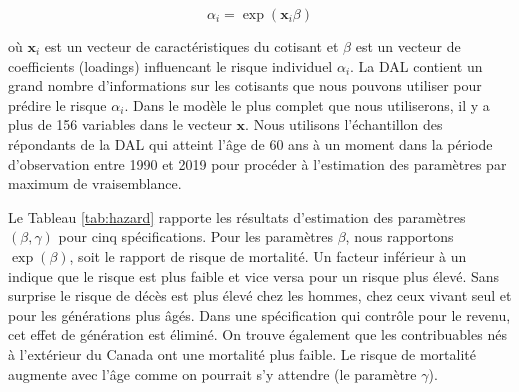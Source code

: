 \documentclass[french, 12pt]{article}
\begin{document}
	$$ \alpha_i = \exp\left(\mathbf{x}_i\beta\right) $$
	
	où $\mathbf{x}_i$ est un vecteur de caractéristiques du cotisant et $\beta$ est un vecteur de coefficients (loadings) influencant le risque individuel $\alpha_i$. La DAL contient un grand nombre d'informations sur les cotisants que nous pouvons utiliser pour prédire le risque $\alpha_i$. Dans le modèle le plus complet que nous utiliserons, il y a plus de 156 variables dans le vecteur $\mathbf{x}$. Nous utilisons l'échantillon des répondants de la DAL qui atteint l'âge de 60 ans à un moment dans la période d'observation entre 1990 et 2019 pour procéder à l'estimation des paramètres par maximum de vraisemblance. 
	
	Le Tableau \ref{tab:hazard} rapporte les résultats d'estimation des paramètres $(\beta,\gamma)$ pour cinq spécifications. Pour les paramètres $\beta$, nous rapportons $\exp(\beta)$, soit le rapport de risque de mortalité. Un facteur inférieur à un indique que le risque est plus faible et vice versa pour un risque plus élevé. Sans surprise le risque de décès est plus élevé chez les hommes, chez ceux vivant seul et pour les générations plus âgés. Dans une spécification qui contrôle pour le revenu, cet effet de génération est éliminé. On trouve également que les contribuables nés à l'extérieur du Canada ont une mortalité plus faible. Le risque de mortalité augmente avec l'âge comme on pourrait s'y attendre (le paramètre $\gamma$).  
	
\end{document}
